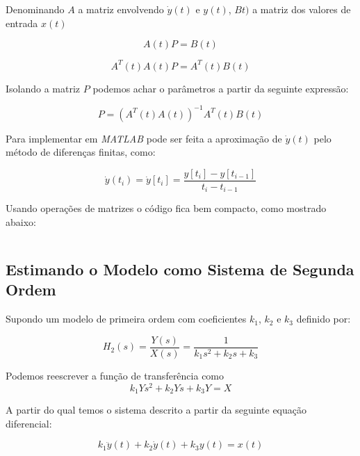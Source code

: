 \documentclass[a4paper,11pt]{article}
\begin{document}

Denominando $A$ a matriz envolvendo $\dot{y}(t)$ e $y(t)$, $Bt)$ a matriz dos valores de entrada $x(t)$

\begin{equation}
    A(t) P = B(t)
\end{equation}

\begin{equation}
    A^T(t)A(t) P = A^T(t) B(t)
\end{equation}

Isolando a matriz $P$ podemos achar o parâmetros a partir da seguinte expressão:

\begin{equation}
    P = \left(A^T(t) A(t)\right)^{-1} A^T(t) B(t)
\end{equation}

Para implementar em \textit{MATLAB} pode ser feita a aproximação de $\dot{y}(t)$ pelo método de diferenças finitas, como:

\begin{equation}
\dot{y}(t_i) = \dot{y}[t_i] = \frac{y[t_i] - y[t_{i-1}]}{t_i - t_{i-1}}
\end{equation}

Usando operações de matrizes o código fica bem compacto, como mostrado abaixo:

\inputminted[frame=single,framesep=10pt]{matlab}{../src/matlab/firstordertf.m}

\subsection{Estimando o Modelo como Sistema de Segunda Ordem}

Supondo um modelo de primeira ordem com coeficientes $k_1$, $k_2$ e $k_3$ definido por:

\begin{equation}\label{eq:secondordertf}
    H_2(s) = \frac{Y(s)}{X(s)} = \frac{1}{k_1 s^2+ k_2 s+ k_3}
\end{equation}


Podemos reescrever a função de transferência como
\begin{equation}
k_1 Ys^2 + k_2 Ys + k_3 Y  = X
\end{equation}

A partir do qual temos o sistema descrito a partir da seguinte equação diferencial:

\begin{equation}
k_1 \ddot{y}(t) + k_2 \dot{y}(t) + k_3 y(t) = x(t)
\end{equation}
\end{document}
